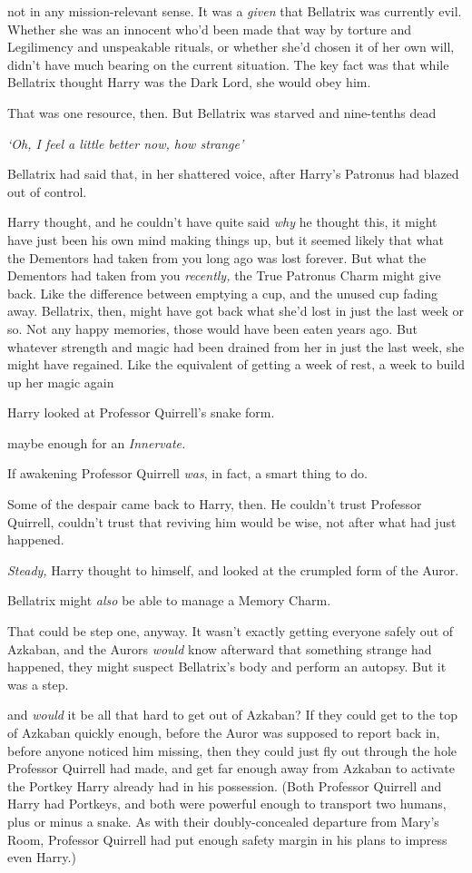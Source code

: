 {\el} not in any mission-relevant sense. It was a \emph{given} that Bellatrix
was currently evil. Whether she was an innocent who'd been made that way by
torture and Legilimency and unspeakable rituals, or whether she'd chosen it of
her own will, didn't have much bearing on the current situation. The key fact
was that while Bellatrix thought Harry was the Dark Lord, she would obey him.

That was one resource, then. But Bellatrix was starved and nine-tenths
dead{\el}

\emph{`Oh, I feel a little better now, how strange{\el}'}

Bellatrix had said that, in her shattered voice, after Harry's Patronus had
blazed out of control.

Harry thought, and he couldn't have quite said \emph{why} he thought this, it
might have just been his own mind making things up, but{\el} it seemed
likely that what the Dementors had taken from you long ago was lost forever.
But what the Dementors had taken from you \emph{recently,} the True Patronus
Charm might give back. Like the difference between emptying a cup, and the
unused cup fading away. Bellatrix, then, might have got back what she'd lost in
just the last week or so. Not any happy memories, those would have been eaten
years ago. But whatever strength and magic had been drained from her in just
the last week, she might have regained. Like the equivalent of getting a week
of rest, a week to build up her magic again{\el}

Harry looked at Professor Quirrell's snake form.

{\el} maybe enough for an \emph{Innervate.}

If awakening Professor Quirrell \emph{was}, in fact, a smart thing to do.

Some of the despair came back to Harry, then. He couldn't trust Professor
Quirrell, couldn't trust that reviving him would be wise, not after what had
just happened.

\emph{Steady,} Harry thought to himself, and looked at the crumpled form of the
Auror.

Bellatrix might \emph{also} be able to manage a Memory Charm.

That could be step one, anyway. It wasn't exactly getting everyone safely out
of Azkaban, and the Aurors \emph{would} know afterward that something strange
had happened, they might suspect Bellatrix's body and perform an autopsy. But
it was a step.

{\el} and \emph{would} it be all that hard to get out of Azkaban? If they
could get to the top of Azkaban quickly enough, before the Auror was supposed
to report back in, before anyone noticed him missing, then they could just fly
out through the hole Professor Quirrell had made, and get far enough away from
Azkaban to activate the Portkey Harry already had in his possession. (Both
Professor Quirrell and Harry had Portkeys, and both were powerful enough to
transport two humans, plus or minus a snake. As with their doubly-concealed
departure from Mary's Room, Professor Quirrell had put enough safety margin in
his plans to impress even Harry.)


